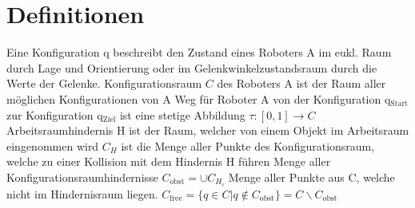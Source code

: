 \section{Definitionen}
Eine Konfiguration q beschreibt den Zustand eines Roboters A im eukl. Raum durch Lage und Orientierung
oder im Gelenkwinkelzustandsraum durch die Werte der Gelenke.
Konfigurationsraum $C$ des Roboters A ist der Raum aller möglichen Konfigurationen von A
Weg für Roboter A von der Konfiguration q$_\text{Start}$ zur Konfiguration q$_\text{Ziel}$ ist eine
stetige Abbildung $\tau:[0,1] \rightarrow C$
Arbeitsraumhindernis H ist der Raum, welcher von einem Objekt im Arbeitsraum eingenommen wird
$C_H$ ist die Menge aller Punkte des Konfigurationsraum, welche zu einer Kollision mit dem Hindernis
H führen
Menge aller Konfigurationsraumhindernisse $C_\text{obst} = \cup C_{H_i}$
Menge aller Punkte aus C, welche nicht im Hindernisraum liegen.
$C_\text{free} =  \{ q \in C | q \notin C_\text{obst}\} = C \backslash C_\text{obst}$
